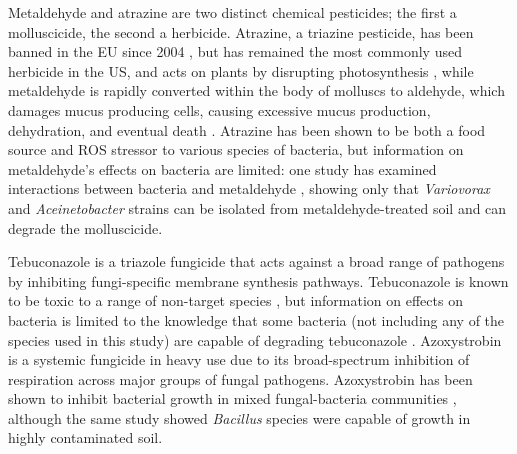 \documentclass[final,1p,times]{elsarticle}
\begin{document}
Metaldehyde and atrazine are two distinct chemical pesticides; the first a molluscicide, the second a herbicide. Atrazine, a triazine pesticide, has been banned in the EU since 2004 \cite{EU2004CommissionSubstance}, but has remained the most commonly used herbicide in the US, and acts on plants by disrupting photosynthesis \cite{Shimabukuro1969AtrazineAction}, while metaldehyde is rapidly converted within the body of molluscs to aldehyde, which damages mucus producing cells, causing excessive mucus production, dehydration, and eventual death \cite{Triebskorn1998}. Atrazine has been shown to be both a food source \cite{Wackett2002BiodegradationStudies} and ROS stressor \cite{Zhang2012OxidativeAtrazine} to various species of bacteria, but information on metaldehyde’s effects on bacteria are limited: one study has examined interactions between bacteria and metaldehyde \cite{Thomas2017IsolationSoils}, showing only that \textit{Variovorax} and \textit{Aceinetobacter} strains can be isolated from metaldehyde-treated soil and can degrade the molluscicide.

Tebuconazole is a triazole fungicide that acts against a broad range of pathogens by inhibiting fungi-specific membrane synthesis pathways. Tebuconazole is known to be toxic to a range of non-target species \cite{Sehnem2010}, but information on effects on bacteria is limited to the knowledge that some bacteria (not including any of the species used in this study) are capable of degrading tebuconazole \cite{Sehnem2010}. Azoxystrobin is a systemic fungicide in heavy use due to its broad-spectrum inhibition of respiration across major groups of fungal pathogens. Azoxystrobin has been shown to inhibit bacterial growth in mixed fungal-bacteria communities \cite{Bacmaga2015MicrobialAzoxystrobin}, although the same study showed \textit{Bacillus} species were capable of growth in highly contaminated soil.

\end{document}

